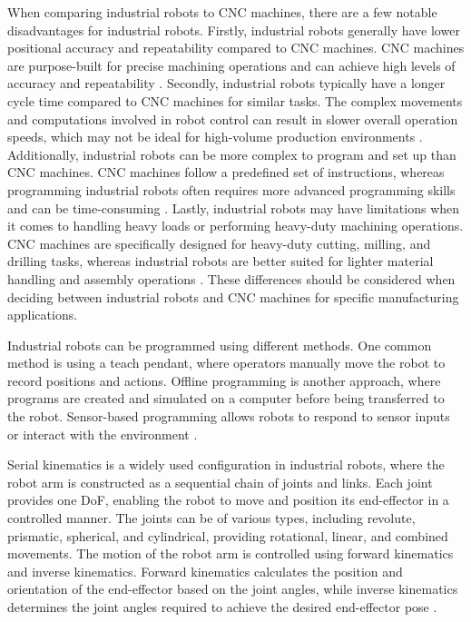 When comparing industrial robots to CNC machines, there are a few notable disadvantages for industrial robots. Firstly, industrial robots generally have lower positional accuracy and repeatability compared to CNC machines. CNC machines are purpose-built for precise machining operations and can achieve high levels of accuracy and repeatability \cite{Wang.2023}.
Secondly, industrial robots typically have a longer cycle time compared to CNC machines for similar tasks. The complex movements and computations involved in robot control can result in slower overall operation speeds, which may not be ideal for high-volume production environments \cite{Joshi.2021}.
Additionally, industrial robots can be more complex to program and set up than CNC machines. CNC machines follow a predefined set of instructions, whereas programming industrial robots often requires more advanced programming skills and can be time-consuming \cite{Ye.2022}. Lastly, industrial robots may have limitations when it comes to handling heavy loads or performing heavy-duty machining operations. CNC machines are specifically designed for heavy-duty cutting, milling, and drilling tasks, whereas industrial robots are better suited for lighter material handling and assembly operations \cite{Wu.2022}. These differences should be considered when deciding between industrial robots and CNC machines for specific manufacturing applications.

Industrial robots can be programmed using different methods. One common method is using a teach pendant, where operators manually move the robot to record positions and actions. Offline programming is another approach, where programs are created and simulated on a computer before being transferred to the robot. Sensor-based programming allows robots to respond to sensor inputs or interact with the environment \cite{Heimann.2020}. %


Serial kinematics is a widely used configuration in industrial robots, where the robot arm is constructed as a sequential chain of joints and links. Each joint provides one DoF, enabling the robot to move and position its end-effector in a controlled manner. The joints can be of various types, including revolute, prismatic, spherical, and cylindrical, providing rotational, linear, and combined movements. The motion of the robot arm is controlled using forward kinematics and inverse kinematics. Forward kinematics calculates the position and orientation of the end-effector based on the joint angles, while inverse kinematics determines the joint angles required to achieve the desired end-effector pose \cite{Singh.2021b}. %


